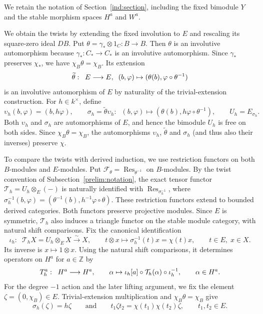 \documentclass[11pt]{article}
\begin{document}
We retain the notation of Section~\ref{ind:section}, including
the fixed bimodule $Y$ and the stable morphism spaces $H^a$ and $W^a$.

We obtain the twists by extending the fixed involution to $E$
and rescaling its square-zero ideal $DB$.
Put $\theta=\gamma_*\otimes1_C:B\to B$. Then $\theta$ is an involutive automorphism because $\gamma_*:C_*\to C_*$ is an involutive automorphism. Since $\gamma_*$ preserves $\chi_*$, we have
$\chi_B\theta=\chi_B$. Its extension
$$\widetilde\theta:\;\; E\longrightarrow E,\;\; (b,\varphi)\mapsto (\theta(b),\varphi\circ\theta^{-1})$$
is an involutive automorphism of $E$ by naturality of the
trivial-extension construction.
For $h\in k^\times$, define
\begin{equation*}
 \upsilon_h(b,\varphi)=(b,h\varphi),\qquad
 \sigma_h=\widetilde\theta\upsilon_h: \;\; (b,\varphi)\mapsto (\theta(b), h\varphi\circ\theta^{-1}), \qquad U_h=E_{\sigma_h}.
\end{equation*}
Both $\upsilon_h$ and $\sigma_h$ are automorphisms of $E$, and hence the bimodule $U_h$ is free on both sides. Since $\chi_B\theta=\chi_B$, the automorphisms $\upsilon_h$, $\widetilde\theta$ and $\sigma_h$ (and thus also their inverses) preserve $\chi$.


To compare the twists with derived induction, we use restriction
functors on both $B$-modules and $E$-modules.
Put $\mathcal F_\theta=\operatorname{Res}_{\theta^{-1}}$ on $B$-modules.
By the twist convention of Subsection~\ref{prelim:notation}, the
exact tensor functor $\mathcal T_h=U_h\otimes_E(-)$ is naturally
identified with $\operatorname{Res}_{\sigma_h^{-1}}$, where $\sigma_h^{-1}(b,\varphi)=(\theta^{-1}(b), h^{-1}\varphi\circ\theta)$.
These restriction functors extend to bounded derived categories.
Both functors preserve projective modules. Since $E$ is symmetric,
$\mathcal T_h$ also induces a triangle functor on the stable module
category, with natural shift comparisons. Fix the canonical identification
\begin{equation*}
 \iota_h:\;\;\mathcal T_hX=U_h\otimes_EX\xrightarrow{\sim}X,
 \qquad t\otimes x\longmapsto\sigma_h^{-1}(t)x=\chi(t)x,\qquad t\in E,\; x\in X.
\end{equation*}
Its inverse is $x\mapsto1\otimes x$.
Using the natural shift comparisons, it determines operators on $H^a$ for $a\in\mathbb{Z}$ by
\[
 T_h^a:\;\; H^a\longrightarrow H^a, \qquad \alpha\mapsto \iota_h[a]\circ\mathcal T_h(\alpha)\circ\iota_h^{-1},
 \qquad\alpha\in H^a.
\]
For the degree $-1$ action and the later lifting argument, we fix
the element $\zeta=(0,\chi_B)\in E$.
Trivial-extension multiplication and $\chi_B\theta=\chi_B$ give
$$\sigma_h(\zeta)=h\zeta \qquad\mbox{and}\qquad t_1\zeta t_2=\chi(t_1)\chi(t_2)\zeta,\qquad t_1, t_2\in E.$$
\end{document}
